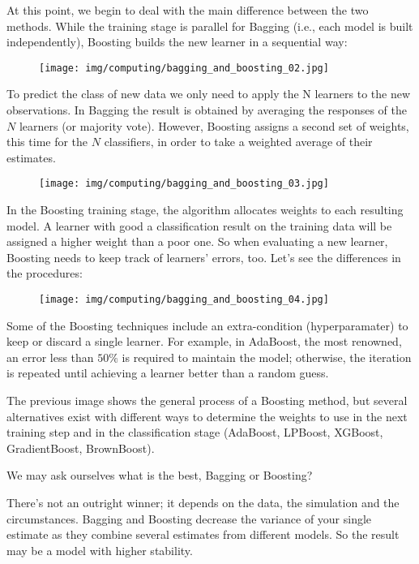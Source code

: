 	At this point, we begin to deal with the main difference between the two methods. While the training stage is parallel for Bagging (i.e., each model is built independently), Boosting builds the new learner in a sequential way:
	\begin{figure}[H]
		\centering
		\texttt{[image: img/computing/bagging\_and\_boosting\_02.jpg]}
	\end{figure}
	To predict the class of new data we only need to apply the N learners to the new observations. In Bagging the result is obtained by averaging the responses of the $N$ learners (or majority vote). However, Boosting assigns a second set of weights, this time for the $N$ classifiers, in order to take a weighted average of their estimates.
	\begin{figure}[H]
		\centering
		\texttt{[image: img/computing/bagging\_and\_boosting\_03.jpg]}
	\end{figure}
	In the Boosting training stage, the algorithm allocates weights to each resulting model. A learner with good a classification result on the training data will be assigned a higher weight than a poor one. So when evaluating a new learner, Boosting needs to keep track of learners’ errors, too. Let’s see the differences in the procedures:
	\begin{figure}[H]
		\centering
		\texttt{[image: img/computing/bagging\_and\_boosting\_04.jpg]}
	\end{figure}
	Some of the Boosting techniques include an extra-condition (hyperparamater) to keep or discard a single learner. For example, in AdaBoost, the most renowned, an error less than $50\%$ is required to maintain the model; otherwise, the iteration is repeated until achieving a learner better than a random guess.

	The previous image shows the general process of a Boosting method, but several alternatives exist with different ways to determine the weights to use in the next training step and in the classification stage (AdaBoost, LPBoost, XGBoost, GradientBoost, BrownBoost).
	
	We may ask ourselves what is the best, Bagging or Boosting?
	
	There's not an outright winner; it depends on the data, the simulation and the circumstances.
Bagging and Boosting decrease the variance of your single estimate as they combine several estimates from different models. So the result may be a model with higher stability.

